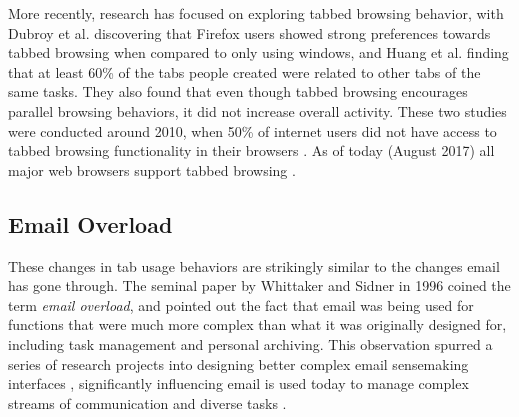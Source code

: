 More recently, research has focused on exploring tabbed browsing behavior, with Dubroy et al.  \cite{Dubroy:2010:STB:1753326.1753426} discovering that Firefox users showed strong preferences towards tabbed browsing when compared to only using windows, and Huang et al. \cite{huang2010parallel} finding that at least 60\% of the tabs people created were related to other tabs of the same tasks. They also found that even though tabbed browsing encourages parallel browsing behaviors, it did not increase overall activity.
These two studies were conducted around 2010, when 50\% of internet users did not have access to tabbed browsing functionality in their browsers \cite{w3counter}. As of today (August 2017) all major web browsers support tabbed browsing \cite{w3counter}. 

\subsection{Email Overload}

These changes in tab usage behaviors are strikingly similar to the changes email has gone through. The seminal paper by Whittaker and Sidner in 1996 coined the term \emph{email overload}, and pointed out the fact that email was being used for functions that were much more complex than what it was originally designed for, including task management and personal archiving. This observation spurred a series of research projects into designing better complex email sensemaking interfaces \cite{whittaker1996email,bellotti2003taking,bellotti2005quality,dabbish2005understanding}, significantly influencing email is used today to manage complex streams of communication and diverse tasks \cite{fisher2006revisiting,grevet2014overload}.

